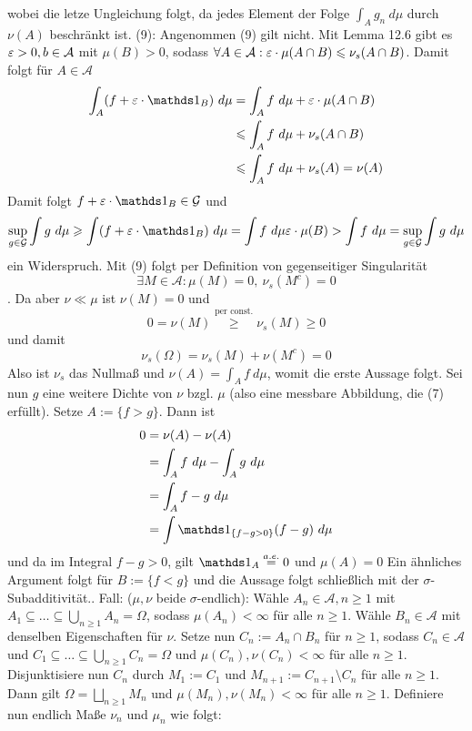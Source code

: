      wobei die letze Ungleichung folgt, da jedes Element der Folge $\int_A g_n \ d\mu$ durch $\nu(A)$ beschr\"ankt ist.\newline\newline
     (9): Angenommen (9) gilt nicht. Mit Lemma 12.6 gibt es $\varepsilon>0,b\in\mathcal{A}$ mit $\mu(B)>0$, sodass $\forall A\in\mathcal{A}:\varepsilon\cdot \mu(A\cap B)\leqslant\nu_s(A\cap B)$. Damit folgt f\"ur $A\in\mathcal{A}$
     \begin{align*}
         \int_A (f+\eps\cdot\ind{B})\ d\mu&=\int_A f\ d\mu+\eps\cdot\mu(A\cap B)\\
         &\leq\int_A f\ d\mu+\nu_s(A\cap B) \\
         &\leq\int_A f\ d\mu+\nu_s(A)=\nu(A)
     \end{align*}
     Damit folgt $f+\eps\cdot\ind{B}\in\mathcal{G}$ und 
     $$\sup_{g\in\mathcal{G}}\int g\ d\mu\geq\int(f+\eps\cdot\ind{B})\ d\mu=\int f\ d\mu\eps\cdot\mu(B)>\int f\ d\mu=\sup_{g\in\mathcal{G}}\int g\ d\mu$$
     ein Widerspruch.
     \newline\newline
     Mit (9) folgt per Definition von gegenseitiger Singularit\"at
     $$\exists M\in\mathcal{A}:\mu(M)=0,\ \nu_s(M^c)=0$$. Da aber $\nu\ll\mu$ ist $\nu(M)=0$ und
     $$0=\nu(M)\overset{\text{per const.}}{\geq}\nu_s(M)\geq0$$
     und damit 
     $$\nu_s(\Omega)=\nu_s(M)+\nu(M^c)=0$$
     Also ist $\nu_s$ das Nullma\ss{} und $\nu(A)=\int_A f\ d\mu$, womit die erste Aussage folgt.\newline
     Sei nun $g$ eine weitere Dichte von $\nu$ bzgl. $\mu$ (also eine messbare Abbildung, die (7) erf\"ullt). Setze $A:=\{f>g\}$. Dann ist
     \begin{align*}
         0&=\nu(A)-\nu(A)\\
         &=\int_A f\ d\mu-\int_A g\ d\mu\\
         &=\int_A f-g\ d\mu \\
         &=\int\ind{\{f-g>0\}}(f-g)\ d\mu
     \end{align*}
     und da im Integral $f-g>0$, gilt $\ind{A}\overset{a.e.}{=}0$ und $\mu(A)=0$
     Ein \"ahnliches Argument folgt f\"ur $B:=\{f<g\}$ und die Aussage folgt schlie\ss{}lich mit der $\sigma$-Subadditivit\"at.\newline{}. Fall: ($\mu,\nu$ beide $\sigma$-endlich): W\"ahle $A_n\in\mathcal{A},n\geq1$ mit $A_1\subseteq\hdots\subseteq\bigcup_{n\geq1}A_n=\Omega$, sodass $\mu(A_n)<\infty$ f\"ur alle $n\geq1$. W\"ahle $B_n\in\mathcal{A}$ mit denselben Eigenschaften f\"ur $\nu$. Setze nun $C_n:=A_n\cap B_n$ f\"ur $n\geq1$, sodass $C_n\in\mathcal{A}$ und $C_1\subseteq\hdots\subseteq\bigcup_{n\geq1}C_n=\Omega$ und $\mu(C_n),\nu(C_n)<\infty$ f\"ur alle $n\geq1$. Disjunktisiere nun $C_n$ durch $M_1:=C_1$ und $M_{n+1}:=C_{n+1}\setminus C_n$ f\"ur alle $n\geq1$. Dann gilt $\Omega=\bigsqcup_{n\geq1}M_n$ und $\mu(M_n),\nu(M_n)<\infty$ f\"ur alle $n\geq1$. Definiere nun endlich Ma\ss{}e $\nu_n$ und $\mu_n$ wie folgt:
